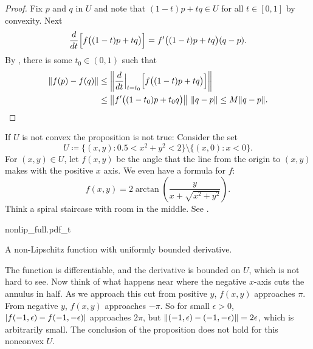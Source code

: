 \begin{proof}
Fix $p$ and $q$ in $U$ and note that
$(1-t)p+tq \in U$ for all $t \in [0,1]$
by convexity.
Next
\begin{equation*}
\frac{d}{dt} \Bigl[f\bigl((1-t)p+tq\bigr)\Bigr]
=
f'\bigl((1-t)p+tq\bigr) (q-p) .
\end{equation*}
By , there is some
$t_0 \in (0,1)$ such that
\begin{equation*}
\begin{split}
\lVert {f(p)-f(q)} \rVert & \leq
\left\lVert {\frac{d}{dt} \Big|_{t=t_0} \Bigl[ f\bigl((1-t)p+tq\bigr) \Bigr] } \right\rVert
\\
& \leq
\left\lVert {f'\bigl((1-t_0)p+t_0q\bigr)} \right\rVert \, \lVert {q-p} \rVert \leq
M \lVert {q-p} \rVert . \qedhere
\end{split}
\end{equation*}
\end{proof}

\begin{example}
If $U$ is not convex the proposition is not true: Consider
the set
\begin{equation*}
U \coloneqq \bigl\{ (x,y) : 0.5 < x^2+y^2 < 2 \bigr\}
\setminus \bigl\{ (x,0) : x < 0 \bigr\} .
\end{equation*}
For $(x,y) \in U$,
let $f(x,y)$ be the angle that the line from the origin to $(x,y)$
makes with the positive $x$ axis.  We even have a formula for $f$:
\begin{equation*}
f(x,y) = 2 \operatorname{arctan}\left( \frac{y}{x+\sqrt{x^2+y^2}}\right) .
\end{equation*}
Think a spiral staircase with room in the middle.  See
.

\begin{myfigureht}
{nonlip_full.pdf_t}
\caption{A non-Lipschitz function with uniformly bounded
derivative.\label{mv:fignonlip}}
\end{myfigureht}

The function is differentiable,
and the derivative is bounded on $U$, which is not hard to see.   Now
think of
what happens near where the negative $x$-axis cuts the annulus in half.
As we approach this cut from positive $y$, $f(x,y)$ approaches $\pi$.
From negative $y$, $f(x,y)$ approaches $-\pi$.
So for small $\epsilon > 0$, $\lvert {f(-1,\epsilon)-f(-1,-\epsilon)} \rvert$
approaches $2\pi$, but $\lVert {(-1,\epsilon)-(-1,-\epsilon)} \rVert = 2\epsilon$,
which is arbitrarily small.  The conclusion of the proposition does not
hold for this nonconvex $U$.
\end{example}

